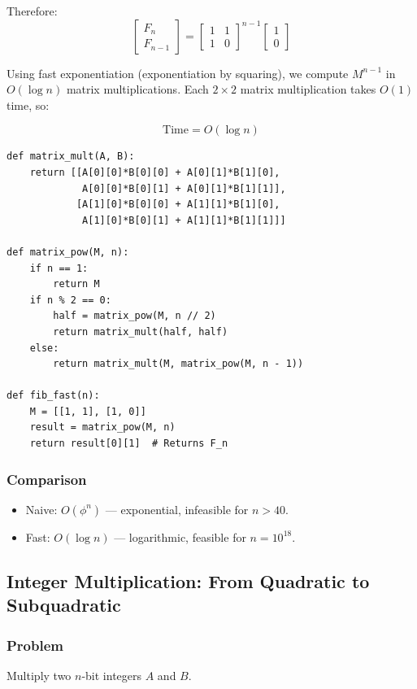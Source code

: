\documentclass[11pt]{article}
\begin{document}
{Therefore:
\[
\begin{bmatrix} F_n \\ F_{n-1} \end{bmatrix} = \begin{bmatrix} 1 & 1 \\ 1 & 0 \end{bmatrix}^{n-1} \begin{bmatrix} 1 \\ 0 \end{bmatrix}
\]

Using fast exponentiation (exponentiation by squaring), we compute $M^{n-1}$ in $O(\log n)$ matrix multiplications. Each $2 \times 2$ matrix multiplication takes $O(1)$ time, so:

\[
\text{Time} = O(\log n)
\]

\begin{lstlisting}
def matrix_mult(A, B):
    return [[A[0][0]*B[0][0] + A[0][1]*B[1][0],
             A[0][0]*B[0][1] + A[0][1]*B[1][1]],
            [A[1][0]*B[0][0] + A[1][1]*B[1][0],
             A[1][0]*B[0][1] + A[1][1]*B[1][1]]]

def matrix_pow(M, n):
    if n == 1:
        return M
    if n % 2 == 0:
        half = matrix_pow(M, n // 2)
        return matrix_mult(half, half)
    else:
        return matrix_mult(M, matrix_pow(M, n - 1))

def fib_fast(n):
    M = [[1, 1], [1, 0]]
    result = matrix_pow(M, n)
    return result[0][1]  # Returns F_n
\end{lstlisting}

\subsubsection*{Comparison}
\begin{itemize}
\item Naive: $O(\phi^n)$ — exponential, infeasible for $n > 40$.
\item Fast: $O(\log n)$ — logarithmic, feasible for $n = 10^{18}$.
\end{itemize}

\subsection*{Integer Multiplication: From Quadratic to Subquadratic}

\subsubsection*{Problem}
Multiply two $n$-bit integers $A$ and $B$.

}
\end{document}
